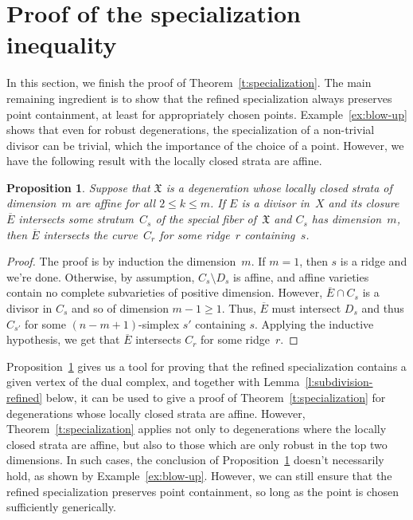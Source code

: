 \documentclass[11pt]{amsart}
\newtheorem{prop}[thm]{Proposition}
\theoremstyle{definition}
\newcommand{\X}{\mathfrak X}
\begin{document}
\section{Proof of the specialization inequality}\label{s:proof}

In this section, we finish the proof of Theorem~\ref{t:specialization}. The
main remaining ingredient is to show that the refined specialization always
preserves point containment, at least for appropriately chosen points.
Example~\ref{ex:blow-up} shows that even for robust degenerations, the
specialization of a non-trivial divisor can be trivial, which the
importance of the choice of a point. However, we have the following
result with the locally closed strata are affine.

\begin{prop}\label{p:locally-closed-affine}
Suppose that $\X$ is a degeneration whose locally closed strata of dimension~$m$
are affine for all
$2 \leq k \leq m$. If $E$ is a divisor in~$X$ and its closure~$\overline
E$ intersects some stratum~$C_s$ of the special fiber of~$\X$ and $C_s$ has
dimension~$m$, then $\overline E$ intersects the curve~$C_r$ for some ridge~$r$
containing~$s$.
\end{prop}

\begin{proof}
The proof is by induction the dimension~$m$. If $m = 1$, then $s$ is a ridge
and we're done. Otherwise, by assumption, $C_s \setminus D_s$ is affine,
and affine varieties contain no complete subvarieties of positive dimension.
However, $\overline E \cap C_s$ is a divisor in $C_s$ and so of dimension $m -
1 \geq 1$. Thus, $\overline E$ must intersect $D_s$ and thus $C_{s'}$ for some
$(n-m+1)$-simplex $s'$ containing $s$. Applying the inductive hypothesis, we
get that $\overline E$ intersects $C_r$ for some ridge~$r$.
\end{proof}

Proposition~\ref{p:locally-closed-affine} gives us a tool for proving that
the refined specialization contains a given vertex of the dual complex, and
together with Lemma~\ref{l:subdivision-refined} below, it can be used to give
a proof of Theorem~\ref{t:specialization} for degenerations whose locally
closed strata are affine. However, Theorem~\ref{t:specialization} applies not
only to degenerations where the locally closed strata are affine, but also to
those which are only robust in the top two dimensions. In such cases, the
conclusion of Proposition~\ref{p:locally-closed-affine} doesn't necessarily
hold, as shown by Example~\ref{ex:blow-up}. However, we can still ensure that
the refined specialization preserves point containment, so long as the point is
chosen sufficiently generically.
\end{document}
